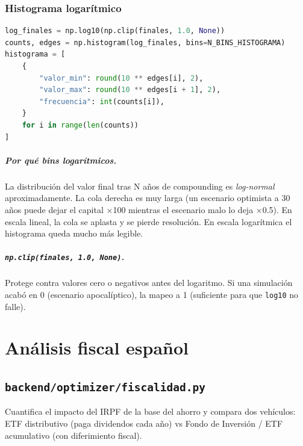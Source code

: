 \documentclass[11pt,a4paper]{book}
\begin{document}
\subsection{Histograma logarítmico}

\begin{lstlisting}[language=Python]
log_finales = np.log10(np.clip(finales, 1.0, None))
counts, edges = np.histogram(log_finales, bins=N_BINS_HISTOGRAMA)
histograma = [
    {
        "valor_min": round(10 ** edges[i], 2),
        "valor_max": round(10 ** edges[i + 1], 2),
        "frecuencia": int(counts[i]),
    }
    for i in range(len(counts))
]
\end{lstlisting}

\paragraph{Por qué bins logarítmicos.} La distribución del valor final tras N años de compounding es \emph{log-normal} aproximadamente. La cola derecha es muy larga (un escenario optimista a 30 años puede dejar el capital ×100 mientras el escenario malo lo deja ×0.5). En escala lineal, la cola se aplasta y se pierde resolución. En escala logarítmica el histograma queda mucho más legible.

\paragraph{\texttt{np.clip(finales, 1.0, None)}.} Protege contra valores cero o negativos antes del logaritmo. Si una simulación acabó en 0 (escenario apocalíptico), la mapeo a 1 (suficiente para que \texttt{log10} no falle).

\chapter{Análisis fiscal español}

\section{\texttt{backend/optimizer/fiscalidad.py}}

Cuantifica el impacto del IRPF de la base del ahorro y compara dos vehículos: ETF distributivo (paga dividendos cada año) vs Fondo de Inversión / ETF acumulativo (con diferimiento fiscal).
\end{document}
